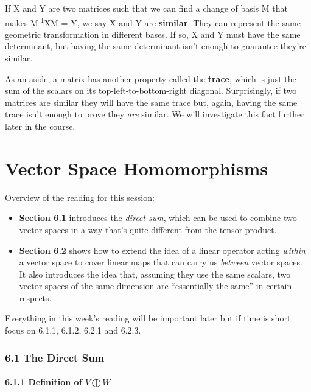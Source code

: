 \documentclass[oneside,english]{amsbook}
\numberwithin{section}{chapter}
\theoremstyle{plain}
\theoremstyle{definition}
\begin{document}
If X and Y are two matrices such that we can find a change of basis M
that makes M\textsuperscript{-1}XM = Y, we say X and Y are
\textbf{similar}. They can represent the same geometric transformation
in different bases. If so, X and Y must have the same determinant, but
having the same determinant isn't enough to guarantee they're similar.

As an aside, a matrix has another property called the \textbf{trace},
which is just the sum of the scalars on its top-left-to-bottom-right
diagonal. Surprisingly, if two matrices are similar they will have the
same trace but, again, having the same trace isn't enough to prove they
\emph{are} similar. We will investigate this fact further later in the
course.

\chapter{Vector Space Homomorphisms}

Overview of the reading for this session:

\begin{itemize}
	\item
	\textbf{Section 6.1} introduces the \emph{direct sum}, which can be
	used to combine two vector spaces in a way that's quite different from
	the tensor product.
	\item
	\textbf{Section 6.2} shows how to extend the idea of a linear operator
	acting \emph{within} a vector space to cover linear maps that can
	carry us \emph{between} vector spaces. It also introduces the idea
	that, assuming they use the same scalars, two vector spaces of the
	same dimension are ``essentially the same'' in certain respects.
\end{itemize}

Everything in this week's reading will be important later but if time is
short focus on 6.1.1, 6.1.2, 6.2.1 and 6.2.3.

\subsection{6.1 The Direct Sum}\label{the-direct-sum}

\subsubsection{\texorpdfstring{6.1.1 Definition of
		\(V\bigoplus W\)}{6.1.1 Definition of V\textbackslash bigoplus W}}\label{definition-of-vbigoplus-w}
\end{document}

